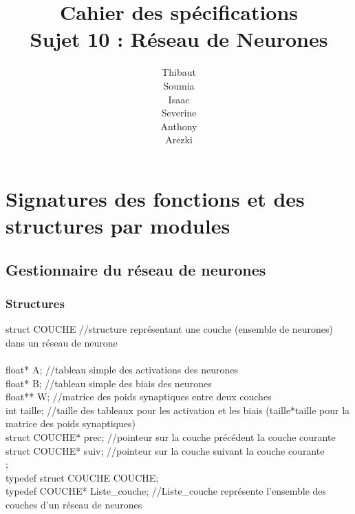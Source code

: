 \documentclass{article}
\begin{document}
\maketitle
\newpage
\title{Cahier des spécifications\\Sujet 10 : Réseau de Neurones}
\author{Thibaut \\Soumia {}\\Isaac {}\\Severine {}\\Anthony {}\\Arezki {}}

\section{Signatures des fonctions et des structures par modules}
	\subsection{Gestionnaire du réseau de neurones}
		\subsubsection{Structures}
			struct COUCHE	//structure représentant une couche (ensemble de neurones) dans un réseau de neurone\\
			{\\
				float* A;	//tableau simple des activations des neurones\\
				float* B;	//tableau simple des biais des neurones\\
				float** W;	//matrice des poids synaptiques entre deux couches\\
				int taille;	//taille des tableaux pour les activation et les biais (taille*taille pour la matrice des poids synaptiques)\\
				
				struct COUCHE* prec;	//pointeur sur la couche précédent la couche courante\\
				struct COUCHE* suiv;	//pointeur sur la couche suivant la couche courante\\
			};\\
			typedef struct COUCHE COUCHE;\\
			typedef COUCHE* Liste_couche;	//Liste_couche représente l'ensemble des couches d'un réseau de neurones\\
			
\end{document}
